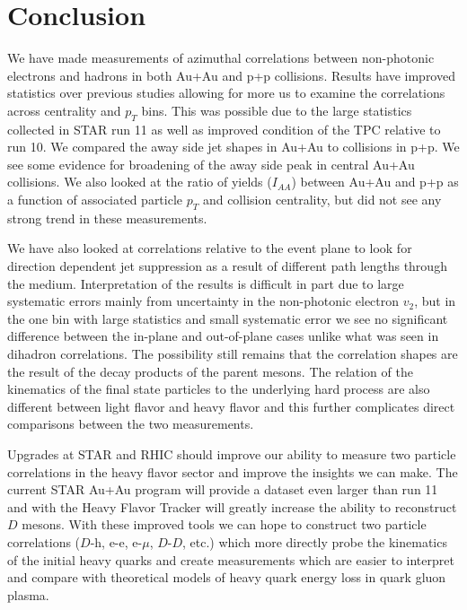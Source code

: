 \chapter{Conclusion}

We have made measurements of azimuthal correlations between non-photonic electrons and hadrons in both Au+Au and p+p collisions. Results have improved statistics over previous studies allowing for more us to examine the correlations across centrality and $p_T$ bins. This was possible due to the large statistics collected in STAR run 11 as well as improved condition of the TPC relative to run 10. We compared the away side jet shapes in Au+Au to collisions in p+p. We see some evidence for broadening of the away side peak in central Au+Au collisions. We also looked at the ratio of yields ($I_{AA}$) between Au+Au and p+p as a function of associated particle $p_T$ and collision centrality, but did not see any strong trend in these measurements. 

We have also looked at correlations relative to the event plane to look for direction dependent jet suppression as a result of different path lengths through the medium. Interpretation of the results is difficult in part due to large systematic errors mainly from uncertainty in the non-photonic electron $v_2$, but in the one bin with large statistics and small systematic error we see no significant difference between the in-plane and out-of-plane cases unlike what was seen in dihadron correlations. The possibility still remains that the correlation shapes are the result of the decay products of the parent mesons. The relation of the kinematics of the final state particles to the underlying hard process are also different between light flavor and heavy flavor and this further complicates direct comparisons between the two measurements.

Upgrades at STAR and RHIC should improve our ability to measure two particle correlations in the heavy flavor sector and improve the insights we can make. The current STAR Au+Au program will provide a dataset even larger than run 11 and with the Heavy Flavor Tracker will greatly increase the ability to reconstruct $D$ mesons. With these improved tools we can hope to construct two particle correlations ($D$-h, e-e, e-$\mu$, $D$-$D$, etc.) which more directly probe the kinematics of the initial heavy quarks and create measurements which are easier to interpret and compare with theoretical models of heavy quark energy loss in quark gluon plasma.
